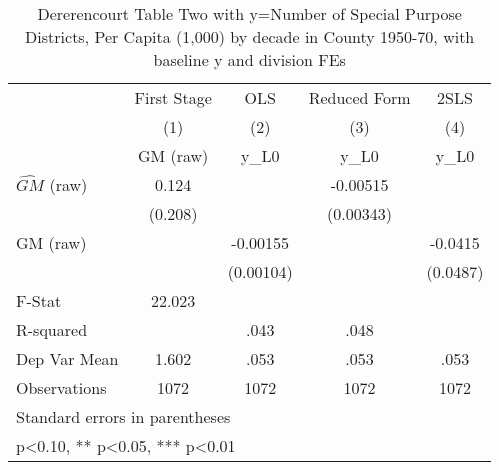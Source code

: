 \begin{table}[htbp]\centering
\def\sym#1{\ifmmode^{#1}\else\(^{#1}\)\fi}
\caption{Dererencourt Table Two with y=Number of Special Purpose Districts, Per Capita (1,000) by decade in County 1950-70, with baseline y and division FEs}
\begin{tabular}{l*{4}{c}}
\toprule
                    & First Stage   &         OLS   &Reduced Form   &        2SLS   \\
                    &\multicolumn{1}{c}{(1)}&\multicolumn{1}{c}{(2)}&\multicolumn{1}{c}{(3)}&\multicolumn{1}{c}{(4)}\\
                    &\multicolumn{1}{c}{GM  (raw)}&\multicolumn{1}{c}{y\_L0}&\multicolumn{1}{c}{y\_L0}&\multicolumn{1}{c}{y\_L0}\\
\midrule
$\hat{GM}$ (raw)    &       0.124   &               &    -0.00515   &               \\
                    &     (0.208)   &               &   (0.00343)   &               \\
\addlinespace
GM  (raw)           &               &    -0.00155   &               &     -0.0415   \\
                    &               &   (0.00104)   &               &    (0.0487)   \\
\midrule
F-Stat              &      22.023   &               &               &               \\
R-squared           &               &        .043   &        .048   &               \\
Dep Var Mean        &       1.602   &        .053   &        .053   &        .053   \\
Observations        &        1072   &        1072   &        1072   &        1072   \\
\bottomrule
\multicolumn{5}{l}{\footnotesize Standard errors in parentheses}\\
\multicolumn{5}{l}{\footnotesize * p<0.10, ** p<0.05, *** p<0.01}\\
\end{tabular}
\end{table}
